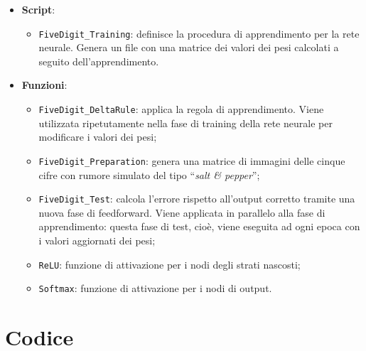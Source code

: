 \documentclass[a4paper,12pt]{article}
\begin{document}
\begin{itemize}
    \item \textbf{Script}:
    \begin{itemize}
        \item \texttt{FiveDigit\_Training}: definisce la procedura di apprendimento per la rete neurale. Genera un file con una matrice dei valori dei pesi calcolati a seguito dell'apprendimento.
    \end{itemize}

    \item \textbf{Funzioni}:
    \begin{itemize}
        \item \texttt{FiveDigit\_DeltaRule}: applica la regola di apprendimento. Viene utilizzata ripetutamente nella fase di training della rete neurale per modificare i valori dei pesi;
        \item \texttt{FiveDigit\_Preparation}: genera una matrice di immagini delle cinque cifre con rumore simulato del tipo ``\emph{salt \& pepper}'';
        \item \texttt{FiveDigit\_Test}: calcola l'errore rispetto all'output corretto tramite una nuova fase di feedforward. Viene applicata in parallelo alla fase di apprendimento: questa fase di test, cioè, viene eseguita ad ogni epoca con i valori aggiornati dei pesi; 
        \item \texttt{ReLU}: funzione di attivazione per i nodi degli strati nascosti;
        \item \texttt{Softmax}: funzione di attivazione per i nodi di output.
    \end{itemize}
\end{itemize}



\newpage
\section{Codice}
\end{document}
